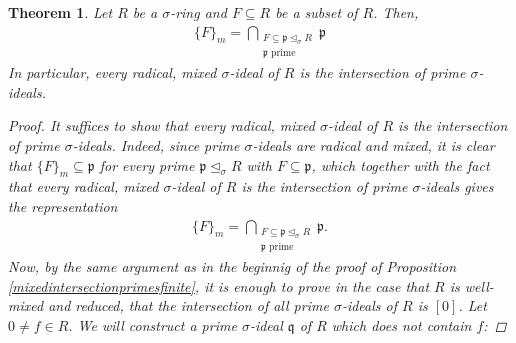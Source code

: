 \documentclass{article}
\def\p{\mathfrak{p}}
\def\q{\mathfrak{q}}
\def\s{\sigma}
\def\si{\unlhd_{\sigma}}
\newenvironment{bew}{\begin{proof}[Proof]}{\end{proof}}
\theoremstyle{plain}
\newtheorem{theorem}[Satz]{Theorem}
\theoremstyle{definition}
\begin{document}
\begin{theorem}\label{intersectionprimes}
Let $R$ be a $\s$-ring and $F \subseteq R$ be a subset of $R$. Then, 
\begin{align*} \{F\}_m = \bigcap_{\substack{F \subseteq \p \si R \\ \p \text{ prime}}} \p \end{align*}
In particular, every radical, mixed $\s$-ideal of $R$ is the intersection of prime $\s$-ideals.
\begin{bew}
It suffices to show that every radical, mixed $\s$-ideal of $R$ is the intersection of prime $\s$-ideals.
Indeed, since prime $\s$-ideals are radical and mixed, it is clear that $\{F\}_m \subseteq \p$ for every prime $\p \si R$ with $F \subseteq \p$, which together with the fact that every radical, mixed $\s$-ideal of $R$ is the intersection of prime $\s$-ideals gives the representation 
\begin{align*} \{F\}_m = \bigcap_{\substack{F \subseteq \p \si R \\ \p \text{ prime}}} \p. \end{align*}
Now, by the same argument as in the beginnig of the proof of Proposition \ref{mixedintersectionprimesfinite}, it is enough to prove in the case that $R$ is well-mixed and reduced, that the intersection of all prime $\s$-ideals of $R$ is $[0]$.
Let $0 \neq f \in R$. We will construct a prime $\s$-ideal $\q$ of $R$ which does not contain $f$: 


\end{bew}
\end{theorem}
\end{document}
